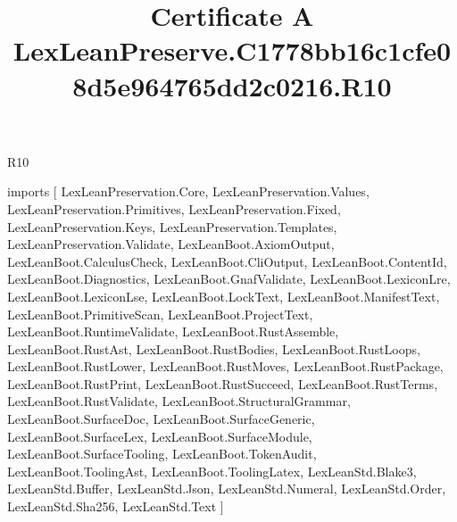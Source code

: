 \begin{lexlean}{R10}
\title{Certificate A LexLeanPreserve.C1778bb16c1cfe08d5e964765dd2c0216.R10}
\begin{coremodule}
imports [
  LexLeanPreservation.Core,
  LexLeanPreservation.Values,
  LexLeanPreservation.Primitives,
  LexLeanPreservation.Fixed,
  LexLeanPreservation.Keys,
  LexLeanPreservation.Templates,
  LexLeanPreservation.Validate,
  LexLeanBoot.AxiomOutput,
  LexLeanBoot.CalculusCheck,
  LexLeanBoot.CliOutput,
  LexLeanBoot.ContentId,
  LexLeanBoot.Diagnostics,
  LexLeanBoot.GnafValidate,
  LexLeanBoot.LexiconLre,
  LexLeanBoot.LexiconLse,
  LexLeanBoot.LockText,
  LexLeanBoot.ManifestText,
  LexLeanBoot.PrimitiveScan,
  LexLeanBoot.ProjectText,
  LexLeanBoot.RuntimeValidate,
  LexLeanBoot.RustAssemble,
  LexLeanBoot.RustAst,
  LexLeanBoot.RustBodies,
  LexLeanBoot.RustLoops,
  LexLeanBoot.RustLower,
  LexLeanBoot.RustMoves,
  LexLeanBoot.RustPackage,
  LexLeanBoot.RustPrint,
  LexLeanBoot.RustSucceed,
  LexLeanBoot.RustTerms,
  LexLeanBoot.RustValidate,
  LexLeanBoot.StructuralGrammar,
  LexLeanBoot.SurfaceDoc,
  LexLeanBoot.SurfaceGeneric,
  LexLeanBoot.SurfaceLex,
  LexLeanBoot.SurfaceModule,
  LexLeanBoot.SurfaceTooling,
  LexLeanBoot.TokenAudit,
  LexLeanBoot.ToolingAst,
  LexLeanBoot.ToolingLatex,
  LexLeanStd.Blake3,
  LexLeanStd.Buffer,
  LexLeanStd.Json,
  LexLeanStd.Numeral,
  LexLeanStd.Order,
  LexLeanStd.Sha256,
  LexLeanStd.Text
]


\end{coremodule}
\end{lexlean}
